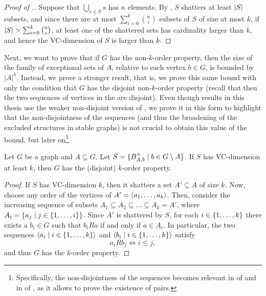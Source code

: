         \begin{proof}[Proof of .]
            Suppose that $\bigcup_{s \in S} s$ has $n$ elements.
            By , $S$ shatters at least $| S |$ subsets, and since there are at most
            $\sum_{i=0}^k \binom{n}{i}$ subsets of $S$ of size at most $k$, if
            $| S | > \sum_{i=0}^k \binom{n}{i}$, at least one of the shattered sets has cardinality larger than $k$,
            and hence the VC-dimension of $S$ is larger than $k$.
        \end{proof}

        Next, we want to prove that if $G$ has the non-$k$-order property, then the size of the family of exceptional
        sets of $A$, relative to each vertex $b \in G$, is bounded by $|A|^k$.
        Instead, we prove a stronger result, that is, we prove this same bound with only the condition that $G$
        has the disjoint non-$k$-order property (recall that then the two sequences of vertices in the
         are disjoint).
        Even though results in this thesis use the weaker non-disjoint version of ,
        we prove it in this form to highlight that the non-disjointness of the sequences (and thus the broadening of
        the excluded structures in stable graphs) is not crucial to obtain this value of the bound, but later on\footnote{
            Specifically, the non-disjointness of the sequences becomes relevant in  of
             and in  of , as it allows
            to prove the existence of \regular pairs.
        }.

        \begin{lemma} \label{lem:vc_dimension_implies_k_order_property}
            Let $G$ be a graph and $A \subseteq G$.
            Let $S = \{ B^+_{A,b} \mid b \in G \setminus A \}$.
            If $S$ has VC-dimension at least $k$, then $G$ has the (disjoint) $k$-order property.
            \begin{proof}
                If $S$ has VC-dimension $k$, then it shatters a set $A' \subseteq A$ of size $k$.
                Now, choose any order of the vertices of $A' = \left< a_1, \dots, a_k \right>$.
                Then, consider the increasing sequence of subsets $A_1 \subseteq A_2 \subseteq \dots \subseteq A_k = A'$,
                where $A_i = \{ a_j \mid j \in \{ 1, \dots, i \} \}$.
                Since $A'$ is shattered by $S$, for each $i \in \{ 1, \dots, k \}$ there exists a $b_i \in G$ such that
                $b_i R a$ if and only if $a \in A_i$.
                In particular, the two sequences $\left< a_i \mid i \in \{ 1, \dots, k \} \right>$ and
                $\left< b_i \mid i \in \{ 1, \dots, k \} \right>$ satisfy
                \[
                    a_i R b_j \Leftrightarrow i \leq j,
                \]
                and thus $G$ has the $k$-order property.
            \end{proof}
        \end{lemma}

